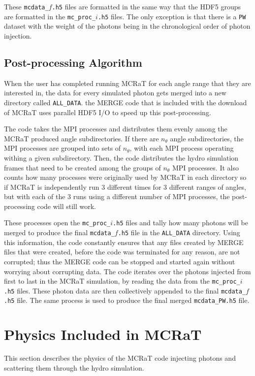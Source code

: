 \documentclass[12pt,a4paper]{article}
\begin{document}
These \texttt{mcdata\_$f$.h5} files are formatted in the same way that the HDF5 groups are formatted in the \texttt{mc\_proc\_$i$.h5} files. The only exception is that there is a \texttt{PW} dataset with the weight of the photons being in the chronological order of photon injection.

\subsection{Post-processing Algorithm}
When the user has completed running MCRaT for each angle range that they are interested in, the data for every simulated photon gets merged into a new directory called \texttt{ALL\_DATA}. the MERGE code that is included with the download of MCRaT uses parallel HDF5 I/O to speed up this post-processing. 

The code takes the MPI processes and distributes them evenly among the MCRaT produced angle subdirectories. If there are $n_\theta$ angle subdirectories, the MPI processes are grouped into sets of $n_\theta$, with each MPI process operating withing a given subdirectory. Then, the code distributes the hydro simulation frames that need to be created among the groups of $n_\theta$ MPI processes. It also counts how many processes were originally used by MCRaT in each directory so if MCRaT is independently run 3 different times for 3 different ranges of angles, but with each of the 3 runs using a different number of MPI processes, the post-processing code will still work.

These processes open the \texttt{mc\_proc\_$i$.h5} files and tally how many photons will be merged to produce the final \texttt{mcdata\_$f$.h5} file in the \texttt{ALL\_DATA} directory. Using this information, the code constantly ensures that any files created by MERGE files that were created, before the code was terminated for any reason, are not corrupted; thus the MERGE code can be stopped and started again without worrying about corrupting data. The code iterates over the photons injected from first to last in the MCRaT simulation, by reading the data from the \texttt{mc\_proc\_$i$.h5} files. These photon data are then collectively appended to the final \texttt{mcdata\_$f$.h5} file. The same process is used to produce the final merged \texttt{mcdata\_PW.h5} file.

\section{Physics Included in MCRaT}
This section describes the physics of the MCRaT code injecting photons and scattering them through the hydro simulation.  
\end{document}
